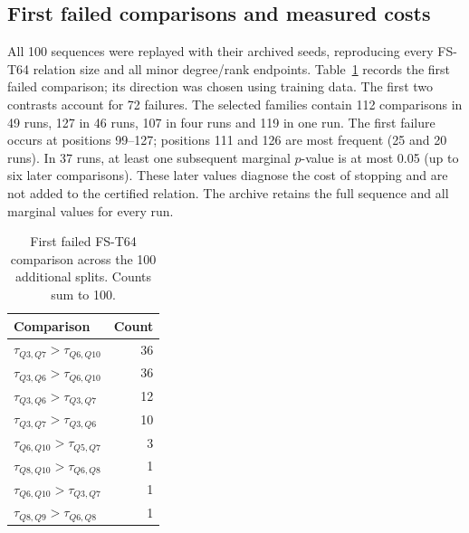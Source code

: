 \subsection{First failed comparisons and measured costs}

\label{sec:sequence-audit}

All 100 sequences were replayed with their archived seeds, reproducing every FS-T64 relation size and all minor degree/rank endpoints. Table~\ref{tab:sequence-stops} records the first failed comparison; its direction was chosen using training data. The first two contrasts account for 72 failures. The selected families contain 112 comparisons in 49 runs, 127 in 46 runs, 107 in four runs and 119 in one run. The first failure occurs at positions 99--127; positions 111 and 126 are most frequent (25 and 20 runs). In 37 runs, at least one subsequent marginal $p$-value is at most 0.05 (up to six later comparisons). These later values diagnose the cost of stopping and are not added to the certified relation. The archive retains the full sequence and all marginal values for every run.

\begin{table}[htbp]\centering\small\caption{First failed FS-T64 comparison across the 100 additional splits. Counts sum to 100.}\label{tab:sequence-stops}\begin{tabular}{lr}\toprule Comparison & Count\\\midrule

$\tau_{Q3,Q7}>\tau_{Q6,Q10}$ & 36\\

$\tau_{Q3,Q6}>\tau_{Q6,Q10}$ & 36\\

$\tau_{Q3,Q6}>\tau_{Q3,Q7}$ & 12\\

$\tau_{Q3,Q7}>\tau_{Q3,Q6}$ & 10\\

$\tau_{Q6,Q10}>\tau_{Q5,Q7}$ & 3\\

$\tau_{Q8,Q10}>\tau_{Q6,Q8}$ & 1\\

$\tau_{Q6,Q10}>\tau_{Q3,Q7}$ & 1\\

$\tau_{Q8,Q9}>\tau_{Q6,Q8}$ & 1\\

\bottomrule\end{tabular}\end{table}

